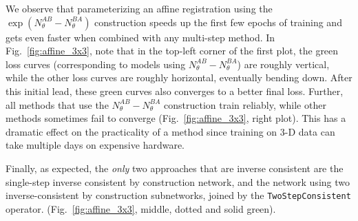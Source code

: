We observe that parameterizing an affine registration using the
$\exp(N_\theta^{AB} - N_\theta^{BA})$ construction speeds up the first few
epochs of training and gets even faster when combined with any multi-step
method. In Fig.~\ref{fig:affine_3x3}, note that in the top-left corner of the
first plot, the green loss curves (corresponding to models using
$N_\theta^{AB} - N_\theta^{BA}$) are roughly vertical, while the other loss
curves are roughly horizontal, eventually bending down. After this initial
lead, these green curves also converges to a better final loss. Further, all
methods that use the $N_\theta^{AB} - N_\theta^{BA}$ construction train
reliably, while other methods sometimes fail to converge
(Fig.~\ref{fig:affine_3x3}, right plot). This has a dramatic effect on the
practicality of a method since training on 3-D data can take multiple days on
expensive hardware.

Finally, as expected, the \emph{only} two approaches that are inverse consistent are the single-step inverse consistent by construction network, and the network using two inverse-consistent by construction subnetworks, joined by the
\texttt{TwoStepConsistent} operator. %
(Fig.~\ref{fig:affine_3x3}, middle, dotted and solid green).

